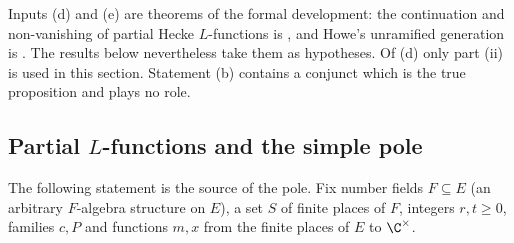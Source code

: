 \begin{remark}\label{pf:liftinj:litrem}
Inputs (d) and (e) are theorems of the formal development: the continuation and non-vanishing of partial Hecke $L$-functions is
, and Howe's unramified generation is
. The results below nevertheless take them as hypotheses. Of (d) only part (ii) is used in
this section. Statement (b) contains a conjunct which is the true proposition and plays no role.
\end{remark}
\subsection{Partial $L$-functions and the simple pole}\label{sec:pf:liftinj:L}

The following statement is the source of the pole. Fix number fields $F\subseteq E$ (an arbitrary
$F$-algebra structure on $E$), a set $S$ of finite places of $F$, integers $r,t\ge0$, families $c,P$ and functions
$m,x$ from the finite places of $E$ to $\C^\times$.


